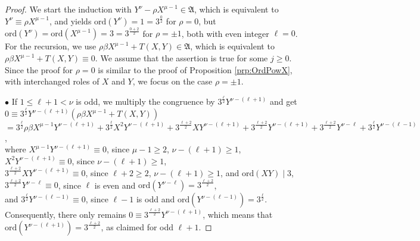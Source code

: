 \documentclass{amsart}
\theoremstyle{definition}
\numberwithin{equation}{section}
\begin{document}
\begin{proof}
We start the induction with \(Y^\nu-\rho X^{\mu-1}\in\mathfrak{A}\), which is equivalent to
\(Y^\nu\equiv\rho X^{\mu-1}\), and yields
\(\mathrm{ord}(Y^\nu)=1=3^{\frac{0}{2}}\) for \(\rho=0\),
but \(\mathrm{ord}(Y^\nu)=\mathrm{ord}(X^{\mu-1})=3=3^{\frac{0+2}{2}}\) for \(\rho=\pm 1\),
both with even integer \(\ell=0\).\\
For the recursion, we use \(\rho\beta X^{\mu-1}+T(X,Y)\in\mathfrak{A}\),
which is equivalent to \(\rho\beta X^{\mu-1}+T(X,Y)\equiv 0\).
We assume that the assertion is true for some \(j\ge 0\).
Since the proof for \(\rho=0\) is similar to the proof of Proposition
\ref{prp:OrdPowX},
with interchanged roles of \(X\) and \(Y\),
we focus on the case \(\rho=\pm 1\).

\(\bullet\)
If \(1\le\ell+1<\nu\) is odd, we multiply the congruence by \(3^{\frac{\ell}{2}}Y^{\nu-(\ell+1)}\) and get\\
\(0\equiv 3^{\frac{\ell}{2}}Y^{\nu-(\ell+1)}\left(\rho\beta X^{\mu-1}+T(X,Y)\right)\)\\
\(=3^{\frac{\ell}{2}}\rho\beta X^{\mu-1}Y^{\nu-(\ell+1)}+3^{\frac{\ell}{2}}X^2Y^{\nu-(\ell+1)}+3^{\frac{\ell+2}{2}}XY^{\nu-(\ell+1)}
+3^{\frac{\ell+2}{2}}Y^{\nu-(\ell+1)}+3^{\frac{\ell+2}{2}}Y^{\nu-\ell}+3^{\frac{\ell}{2}}Y^{\nu-(\ell-1)}\),\\
where \(X^{\mu-1}Y^{\nu-(\ell+1)}\equiv 0\), since \(\mu-1\ge 2\), \(\nu-(\ell+1)\ge 1\),\\
\(X^2Y^{\nu-(\ell+1)}\equiv 0\), since \(\nu-(\ell+1)\ge 1\),\\
\(3^{\frac{\ell+2}{2}}XY^{\nu-(\ell+1)}\equiv 0\), since \(\ell+2\ge 2\), \(\nu-(\ell+1)\ge 1\), and \(\mathrm{ord}(XY)\mid 3\),\\
\(3^{\frac{\ell+2}{2}}Y^{\nu-\ell}\equiv 0\), since \(\ell\) is even and \(\mathrm{ord}(Y^{\nu-\ell})=3^{\frac{\ell+2}{2}}\),\\
and \(3^{\frac{\ell}{2}}Y^{\nu-(\ell-1)}\equiv 0\), since \(\ell-1\) is odd and \(\mathrm{ord}(Y^{\nu-(\ell-1)})=3^{\frac{\ell}{2}}\).\\
Consequently, there only remains \(0\equiv 3^{\frac{\ell+2}{2}}Y^{\nu-(\ell+1)}\), which means that
\(\mathrm{ord}(Y^{\nu-(\ell+1)})=3^{\frac{\ell+2}{2}}\), as claimed for odd \(\ell+1\).


\end{proof}
\end{document}
